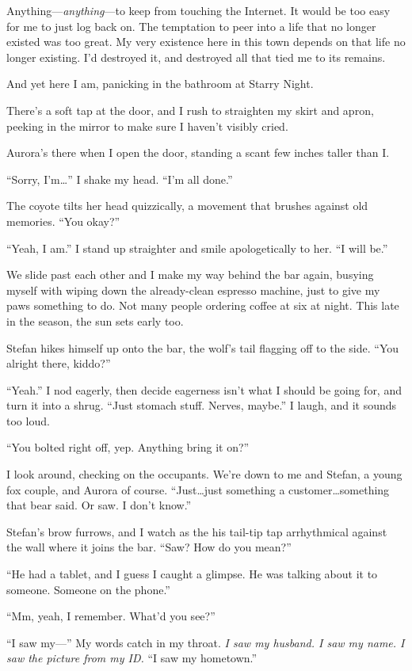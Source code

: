 Anything---\emph{anything}---to keep from touching the Internet. It would be too easy for me to just log back on. The temptation to peer into a life that no longer existed was too great. My very existence here in this town depends on that life no longer existing. I'd destroyed it, and destroyed all that tied me to its remains.

And yet here I am, panicking in the bathroom at Starry Night.

There's a soft tap at the door, and I rush to straighten my skirt and apron, peeking in the mirror to make sure I haven't visibly cried.

Aurora's there when I open the door, standing a scant few inches taller than I.

``Sorry, I'm\ldots{}'' I shake my head. ``I'm all done.''

The coyote tilts her head quizzically, a movement that brushes against old memories. ``You okay?''

``Yeah, I am.'' I stand up straighter and smile apologetically to her. ``I will be.''

We slide past each other and I make my way behind the bar again, busying myself with wiping down the already-clean espresso machine, just to give my paws something to do. Not many people ordering coffee at six at night. This late in the season, the sun sets early too.

Stefan hikes himself up onto the bar, the wolf's tail flagging off to the side. ``You alright there, kiddo?''

``Yeah.'' I nod eagerly, then decide eagerness isn't what I should be going for, and turn it into a shrug. ``Just stomach stuff. Nerves, maybe.'' I laugh, and it sounds too loud.

``You bolted right off, yep. Anything bring it on?''

I look around, checking on the occupants. We're down to me and Stefan, a young fox couple, and Aurora of course. ``Just\ldots{}just something a customer\ldots{}something that bear said. Or saw. I don't know.''

Stefan's brow furrows, and I watch as the his tail-tip tap arrhythmical against the wall where it joins the bar. ``Saw? How do you mean?''

``He had a tablet, and I guess I caught a glimpse. He was talking about it to someone. Someone on the phone.''

``Mm, yeah, I remember. What'd you see?''

``I saw my---'' My words catch in my throat. \emph{I saw my husband. I saw my name. I saw the picture from my ID.} ``I saw my hometown.''

